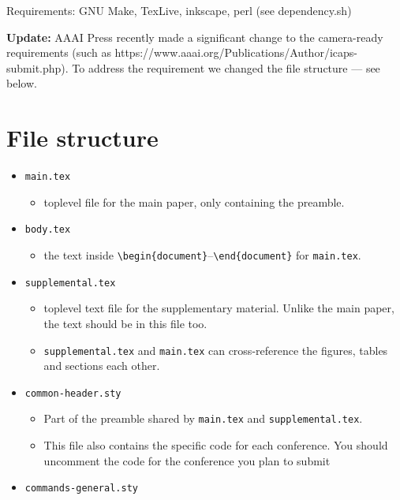 Requirements: GNU Make, TexLive, inkscape, perl (see dependency.sh)

\textbf{Update:} AAAI Press recently made a significant change to the
camera-ready requirements (such as
https://www.aaai.org/Publications/Author/icaps-submit.php). To address
the requirement we changed the file structure --- see below.

\section{File structure}

\begin{itemize}

\item
  \texttt{main.tex}

  \begin{itemize}
  
  \item
    toplevel file for the main paper, only containing the preamble.
  \end{itemize}
\item
  \texttt{body.tex}

  \begin{itemize}
  
  \item
    the text inside
    \texttt{\textbackslash{}begin\{document\}}--\texttt{\textbackslash{}end\{document\}}
    for \texttt{main.tex}.
  \end{itemize}
\item
  \texttt{supplemental.tex}

  \begin{itemize}
  
  \item
    toplevel text file for the supplementary material. Unlike the main
    paper, the text should be in this file too.
  \item
    \texttt{supplemental.tex} and \texttt{main.tex} can cross-reference
    the figures, tables and sections each other.
  \end{itemize}
\item
  \texttt{common-header.sty}

  \begin{itemize}
  
  \item
    Part of the preamble shared by \texttt{main.tex} and
    \texttt{supplemental.tex}.
  \item
    This file also contains the specific code for each conference. You
    should uncomment the code for the conference you plan to submit
  \end{itemize}
\item
  \texttt{commands-general.sty}


\end{itemize}
